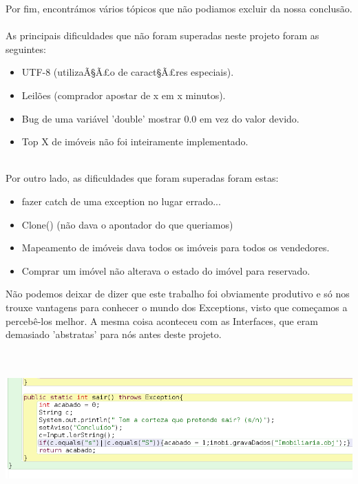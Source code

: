 \documentclass[12pt]{article}
\begin{document}
Por fim, encontrámos vários tópicos que não podiamos excluir da nossa conclusão.
~\\
As principais dificuldades que não foram superadas neste projeto foram as seguintes:
\begin{itemize}
\item UTF-8 (utilizaÃ§Ã£o de caract§Ã£res especiais).
\item Leilões (comprador apostar de x em x minutos).
\item Bug de uma variável 'double'  mostrar 0.0 em vez do valor devido.
\item Top X de imóveis não foi inteiramente implementado.
\end{itemize}
~\\
Por outro lado, as dificuldades que foram superadas foram estas:
\begin{itemize}
\item fazer catch de uma exception no lugar errado...
\item Clone() (não dava o apontador do que queriamos)
\item Mapeamento de imóveis dava todos os imóveis para todos os vendedores.
\item Comprar um imóvel não alterava o estado do imóvel para reservado.
\end{itemize}

Não podemos deixar de dizer que este trabalho foi obviamente produtivo e só nos trouxe vantagens para conhecer o mundo dos Exceptions, visto que começamos a percebê-los melhor. A mesma coisa aconteceu com as Interfaces, que eram demasiado 'abstratas' para nós antes deste projeto.

~\\
~\\

\includegraphics[scale=0.4]{005.png}	
\end{document}
